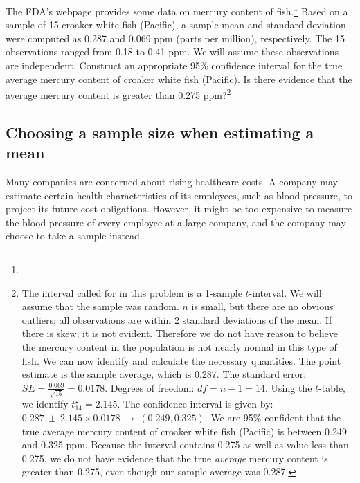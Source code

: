 \begin{exercise} \label{croakerWhiteFishPacificExerConditions}
The FDA's webpage provides some data on mercury content of fish.\footnote{} Based on a sample of 15 croaker white fish (Pacific), a sample mean and standard deviation were computed as 0.287 and 0.069 ppm (parts per million), respectively. The 15 observations ranged from 0.18 to 0.41 ppm. We will assume these observations are independent. Construct an appropriate 95\% confidence interval for the true average mercury content of croaker white fish (Pacific). Is there evidence that the average mercury content is greater than 0.275 ppm?\footnote{The interval called for in this problem is a 1-sample $t$-interval. We will assume that the sample was random. $n$ is small, but there are no obvious outliers; all observations are within 2 standard deviations of the mean. If there is skew, it is not evident. Therefore we do not have reason to believe the mercury content in the population is not nearly normal in this type of fish. We can now identify and calculate the necessary quantities. The point estimate is the sample average, which is 0.287.
The standard error: $SE = \frac{0.069}{\sqrt{15}} = 0.0178$. Degrees of freedom: $df = n - 1 = 14$. Using the $t$-table, we identify $t^{\star}_{14} = 2.145$.
The confidence interval is given by: $0.287 \ \pm\  2.145\times 0.0178\ \to\ (0.249, 0.325)$. We are 95\% confident that the true average mercury content of croaker white fish (Pacific) is between 0.249 and 0.325 ppm. Because the interval contains 0.275 as well as value less than 0.275, we do not have evidence that the true \emph{average} mercury content is  greater than 0.275, even though our sample average was 0.287.}
\end{exercise}


\subsection{Choosing a sample size when estimating a mean}
\label{findingASampleSizeForACertainME}


Many companies are concerned about rising healthcare costs. A company may estimate certain health characteristics of its employees, such as blood pressure, to project its future cost obligations. However, it might be too expensive to measure the blood pressure of every employee at a large company, and the company may choose to take a sample instead.

